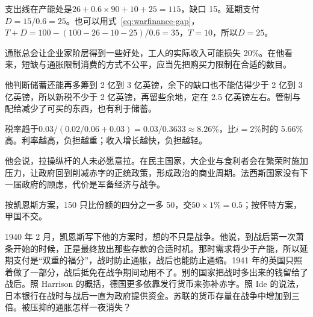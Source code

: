 \begin{answers}
\item 支出线在产能处是$26+0.6\times90+10+25=115$，缺口 15。延期支付$D=15/0.6=25$。也可以用式~\eqref{eq:warfinance-gap}，$T+D=100-(100-26-10-25)/0.6=35$，$T=10$，所以$D=25$。
\item 通胀总会让企业家阶层得到一些好处，工人的实际收入可能损失 20\%。在他看来，短缺与通胀限制消费的方式不公平，应当先把购买力限制在合适的数目。
\item 他判断储蓄还能再多筹到 2 亿到 3 亿英镑，余下的缺口也不能估得少于 2 亿到 3 亿英镑，所以新税不少于 2 亿英镑，再留些余地，定在 2.5 亿英镑左右。管制与配给减少了可买的东西，也有利于储蓄。
\item 税率趋于$0.03/(0.02/0.06+0.03)=0.03/0.3633\approx8.26\%$，比$i=2\%$时的 5.66\% 高。利率越高，负担越重；收入增长越快，负担越轻。
\item 他会说，拉操纵杆的人未必愿意拉。在民主国家，大企业与食利者会在繁荣时施加压力，让政府回到削减赤字的正统政策，形成政治的商业周期。法西斯国家没有下一届政府的顾虑，代价是军备经济与战争。
\item 按凯恩斯方案，150 只比份额的四分之一多 50，交$50\times1\%=0.5$；按怀特方案，甲国不交。
\end{answers}

1940 年 2 月，凯恩斯写下他的方案时，想的不只是战争。他说，到战后第一次萧条开始的时候，正是最终放出那些存款的合适时机\cite{keynes1940}。那时需求将少于产能，所以延期支付是“双重的福分”，战时防止通胀，战后也能防止通缩\cite{keynes1940}。1941 年的英国只照着做了一部分，战后抵免在战争期间动用不了\cite{hansard1941}。别的国家把战时多出来的钱留给了战后。照 Harrison 的概括，德国更多依靠发行货币来弥补赤字\cite{harrison1992}。照 Ide 的说法，日本银行在战时与战后一直为政府提供资金\cite{ide2003}。苏联的货币存量在战争中增加到三倍\cite{harrison1998b}。被压抑的通胀怎样一夜消失？
